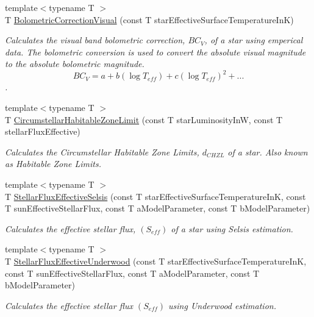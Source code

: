 \begin{DoxyCompactItemize}
{\footnotesize template$<$typename T $>$ }\\T \mbox{\hyperlink{group___e_g_x_phys-_astrophysic-_bolometric_correction_ga31e794be67c861c4eb84d58e8e88883c}{Bolometric\+Correction\+Visual}} (const T star\+Effective\+Surface\+Temperature\+InK)
\begin{DoxyCompactList}\small\item\em Calculates the visual band bolometric correction, $BC_{V}$, of a star using emperical data. The bolometric conversion is used to convert the absolute visual magnitude to the absolute bolometric magnitude. \[ BC_{V}=a + b ( \log T_{eff}) + c ( \log T_{eff})^2 + ...\]. \end{DoxyCompactList}\item 
{\footnotesize template$<$typename T $>$ }\\T \mbox{\hyperlink{group___e_g_x_phys-_circumstellar_habitable_zone_limit_ga809f4c557ce6d2fe566a69c2a8a5d41b}{Circumstellar\+Habitable\+Zone\+Limit}} (const T star\+Luminosity\+InW, const T stellar\+Flux\+Effective)
\begin{DoxyCompactList}\small\item\em Calculates the Circumstellar Habitable Zone Limits, $d_{CHZL}$ of a star. Also known as Habitable Zone Limits. \end{DoxyCompactList}\item 
{\footnotesize template$<$typename T $>$ }\\T \mbox{\hyperlink{group___e_g_x_phys-_circumstellar_habitable_zone_limit_ga0eb1003b4cfcbcafde635cefca5ae5c2}{Stellar\+Flux\+Effective\+Selsis}} (const T star\+Effective\+Surface\+Temperature\+InK, const T sun\+Effective\+Stellar\+Flux, const T a\+Model\+Parameter, const T b\+Model\+Parameter)
\begin{DoxyCompactList}\small\item\em Calculates the effective stellar flux, $(S_{eff})$ of a star using Selsis estimation. \end{DoxyCompactList}\item 
{\footnotesize template$<$typename T $>$ }\\T \mbox{\hyperlink{group___e_g_x_phys-_circumstellar_habitable_zone_limit_gafe02cffcc63c39794feb6f1de5e7a9bb}{Stellar\+Flux\+Effective\+Underwood}} (const T star\+Effective\+Surface\+Temperature\+InK, const T sun\+Effective\+Stellar\+Flux, const T a\+Model\+Parameter, const T b\+Model\+Parameter)
\begin{DoxyCompactList}\small\item\em Calculates the effective stellar flux $(S_{eff})$ using Underwood estimation. \end{DoxyCompactList}\item 

\end{DoxyCompactItemize}
